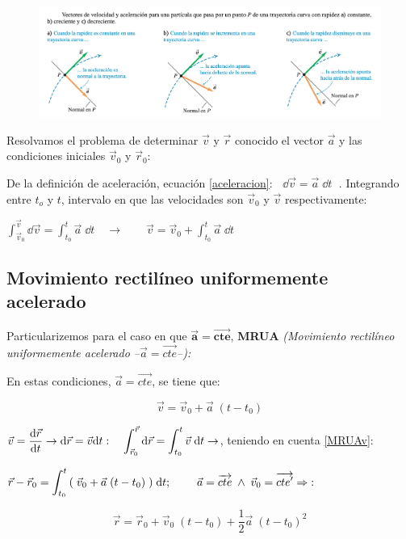 \begin{figure}[H]
		\centering
		\includegraphics[width=1\textwidth]{imagenes/imagenes02/T02IM15.png}
		\end{figure}

Resolvamos el problema de determinar $\vec v$ y $\vec r$ conocido el vector $\vec a$ y las condiciones iniciales $\vec v_0$ y $\vec r_0$:

De la definición de aceleración, ecuación \ref{aceleracion}: $\;\;\dd \vec v= \vec a\; \dd t\;$ . Integrando entre $t_o$ y $t$, intervalo en que las velocidades son $\vec v_0$ y $\vec v$ respectivamente:

$\displaystyle \int_{\vec v_0}^{\vec v}\dd \vec v= \int_{t_0}^{t} \vec a\; \dd t \quad \to \qquad \vec v=\vec v_0+\int_{t_0}^{t} \vec a\; \dd t$

\subsection{Movimiento rectilíneo uniformemente acelerado}

Particularizemos para el caso en que $\boldsymbol{ \vec a=\overrightarrow{cte} }$, \textbf{MRUA} \emph{(Movimiento rectilíneo uniformemente acelerado --$\vec a=\overrightarrow{cte}$--):}

En estas condiciones, $\vec a=\overrightarrow{cte}$, se tiene que:

\begin{equation}
\label{MRUAv}
	\vec v=\vec v_0+\vec a\; (t-t_0)
\end{equation}

$\displaystyle \vec v=\dv{\vec r}{t} \to \dd \vec r=\vec v\dd t : \quad \int_{\vec r_0}^{\vec r}\dd \vec r=\int_{t_0}^t \vec v\;\dd t \to$, teniendo en cuenta \ref{MRUAv}:

$\displaystyle \vec r-\vec r_0=\int_{t_0}^t 
\qty(\; \vec v_0+\vec a\; (t-t_0) \;)
\; \dd t;\; \qquad \vec a=\overrightarrow{cte} \; \wedge \; \vec v_0=\overrightarrow{cte'} \Rightarrow\;:$

\begin{equation}
\label{MRUAr}
	\vec r=\vec r_0+ \vec v_0\; (t-t_0)+\dfrac 1 2 \vec a\; (t-t_0)^2
\end{equation}

